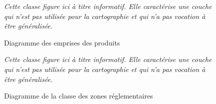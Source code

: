 \documentclass{themeensg}
\begin{document}
\begin{appendices}
\addtocounter{figure}{-1}
\begin{figure}
\addtocounter{figure}{1}
\centering
{}%
\caption{Diagramme des emprises des produits}%
\textit{Cette classe figure ici à titre informatif. Elle caractérise une couche qui n'est pas utilisée pour la cartographie et qui n'a pas vocation à être généralisée.}
\end{figure}

\addtocounter{figure}{-1}
\begin{figure}
\addtocounter{figure}{1}
\centering
{}%
\caption{Diagramme de la classe des zones réglementaires}%
\textit{Cette classe figure ici à titre informatif. Elle caractérise une couche qui n'est pas utilisée pour la cartographie et qui n'a pas vocation à être généralisée.}
\end{figure}


\end{appendices}
\end{document}
